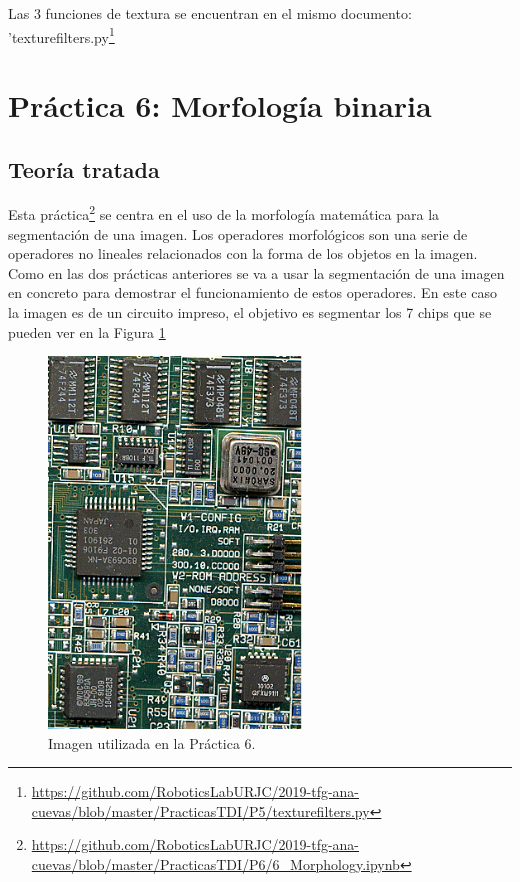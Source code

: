 Las 3 funciones de textura se encuentran en el mismo documento: 'texturefilters.py\footnote{\url{https://github.com/RoboticsLabURJC/2019-tfg-ana-cuevas/blob/master/PracticasTDI/P5/texturefilters.py}}

\section{Práctica 6: Morfología binaria}
\subsection{Teoría tratada}

Esta práctica\footnote{\url{https://github.com/RoboticsLabURJC/2019-tfg-ana-cuevas/blob/master/PracticasTDI/P6/6_Morphology.ipynb}} se centra en el uso de la morfología matemática para la segmentación de una imagen. Los operadores morfológicos son una serie de operadores no lineales relacionados con la forma de los objetos en la imagen. Como en las dos prácticas anteriores se va a usar la segmentación de una imagen en concreto para demostrar el funcionamiento de estos operadores. En este caso la imagen es de un circuito impreso, el objetivo es segmentar los 7 chips que se pueden ver en la Figura \ref{placa}\\

\begin{figure}[h]
\centering
\includegraphics[width=0.6\textwidth]{imagenes/placa}
\caption{Imagen utilizada en la Práctica 6.}
\label{placa}
\end{figure}

